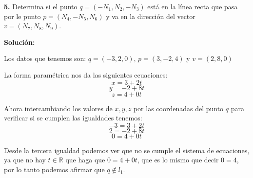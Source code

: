 \documentclass{article}
\begin{document}
\textbf{5.} Determina si el punto $q = (-N_1, N_2,-N_3)$ está en la línea recta que pasa por le punto $p=(N_4,-N_5,N_6)$ y 
va en la dirección del vector $v = (N_7,N_8,N_9)$.
\vspace{10pt}

\textbf{Solución:}
\vspace*{10pt}

Los datos que tenemos son: $q = (-3, 2,0)$, $p=(3,-2,4)$ y $v = (2,8,0)$

La forma paramétrica nos da las siguientes ecuaciones:
$$x = 3 +2 t$$
$$y = -2 +8t$$
$$z = 4 +0t$$

Ahora intercambiando los valores de $x,y,z$ por las coordenadas del punto $q$ para verificar si se cumplen las igualdades tenemos:
$$-3 = 3 +2 t$$
$$2 = -2 +8t$$
$$0 = 4 +0t$$

Desde la tercera igualdad podemos ver que no se cumple el sistema de ecuaciones, ya que no hay $t \in \mathbb{R}$ que haga que $0 = 4 +0t$, 
que es lo mismo que decir $0 = 4$, por lo tanto podemos afirmar que $q \not\in l_1$. 
\end{document}
